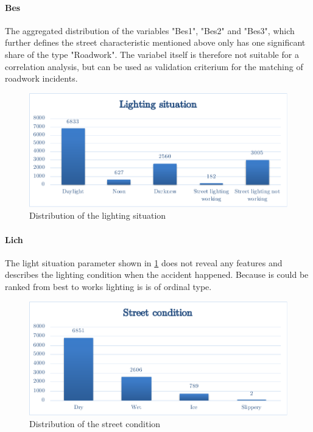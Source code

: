 \documentclass[a4paper,12pt]{report}
\begin{document}
\paragraph{Bes}
The aggregated distribution of the variables "Bes1", "Bes2" and "Bes3", which further defines the street characteristic mentioned above only has one significant share of the type "Roadwork". The variabel itself is therefore not suitable for a correlation analysis, but can be used as validation criterium for the matching of roadwork incidents.

\begin{figure}[h]
	\centering
	\includegraphics[scale=0.6]{./assets/baysis_dataset_Lich.pdf}
	\caption{Distribution of the lighting situation}
	\label{img:baysis_dataset_Lich}
\end{figure}

\paragraph{Lich}
The light situation parameter shown in \ref{img:baysis_dataset_Lich} does not reveal any features and describes the lighting condition when the accident happened. Because is could be ranked from best to works lighting is is of ordinal type.

\begin{figure}[h]
	\centering
	\includegraphics[scale=0.6]{./assets/baysis_dataset_Zust}
	\caption{Distribution of the street condition}
	\label{img:baysis_dataset_Zust}
\end{figure}
\end{document}
